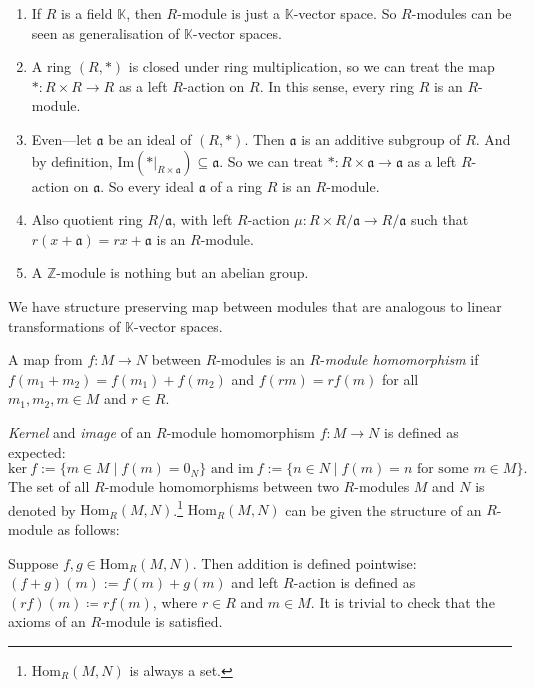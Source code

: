 \begin{example}
    \begin{enumerate}[label=\arabic*)]
        \item If \(R\) is a field  \(\mathbb{K}\), then  \(R\)-module is just a \(\mathbb{K}\)-vector space. So \(R\)-modules can be seen as generalisation of \(\mathbb{K}\)-vector spaces.
        \item A ring  \((R, \ast)\) is closed under ring multiplication, so we can treat the map  \(\ast: R \times R \longrightarrow R\) as a left  \(R\)-action on  \(R\). In this sense, every ring  \(R\) is an  \(R\)-module. 
        \item Even---let \(\mathfrak{a}\) be an ideal of \((R, \ast)\). Then  \(\mathfrak{a}\) is an additive subgroup of \(R\). And by definition, \(\text{Im}(\ast|_{R \times \mathfrak{a}}) \subseteq \mathfrak{a}\). So we can treat \(\ast: R \times \mathfrak{a} \longrightarrow \mathfrak{a}\) as a left \(R\)-action on  \(\mathfrak{a}\). So every ideal \(\mathfrak{a}\) of a ring \(R\) is an  \(R\)-module.
    \item Also quotient ring \(R/\mathfrak{a}\), with left  \(R\)-action \(\mu: R \times R/\mathfrak{a} \longrightarrow R/\mathfrak{a}\) such that \(r (x + \mathfrak{a}) = rx + \mathfrak{a}\)  is an \(R\)-module.
    \item A \(\mathbb{Z}\)-module is nothing but an abelian group.
 \end{enumerate}
\end{example}
We have structure preserving map between modules that are analogous to linear transformations of \(\mathbb{K}\)-vector spaces.
\begin{definition}
    A map from \(f: M \longrightarrow N\) between  \(R\)-modules is an  \(R\)-\emph{module homomorphism} if \(f(m_1+ m_2) = f(m_1) + f(m_2)\) and \(f(rm) = r f(m)\) for all  \(m_1,m_2, m \in M\) and \(r \in R\).   
\end{definition}
\emph{Kernel} and \emph{image} of an \(R\)-module homomorphism \(f: M \longrightarrow N\) is defined as expected:
\[
    \text{ker} \ f := \{m \in M  \mid  f(m) = 0_N\} \text{ and } \text{im} \ f := \{n \in N  \mid f(m) = n \text{ for some } m \in M\} .
\] 
The set of all \(R\)-module homomorphisms between two \(R\)-modules  \(M\) and  \(N\) is denoted by  \(\text{Hom}_R(M, N)\).\footnote{\(\text{Hom}_R(M,N)\) is always a set.}  \(\text{Hom}_R(M,N)\) can be given the structure of an  \(R\)-module as follows:

Suppose \(f, g \in \text{Hom}_R(M,N)\). Then  addition is defined pointwise: \((f+ g)(m) := f(m) + g(m)\) and  left \(R\)-action is defined as \((rf)(m) \coloneq r f(m)\), where \(r \in R\) and  \(m \in M\). It is trivial to check that the axioms of an \(R\)-module is satisfied.

